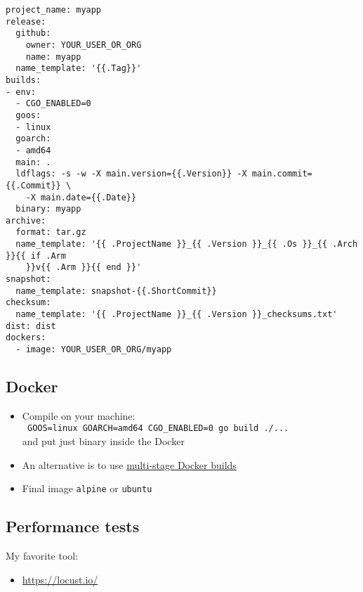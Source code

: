 \documentclass[11pt, letterpaper]{article}
\begin{document}
\begin{verbatim}
project_name: myapp
release:
  github:
    owner: YOUR_USER_OR_ORG
    name: myapp
  name_template: '{{.Tag}}'
builds:
- env:
  - CGO_ENABLED=0
  goos:
  - linux
  goarch:
  - amd64
  main: .
  ldflags: -s -w -X main.version={{.Version}} -X main.commit={{.Commit}} \
    -X main.date={{.Date}}
  binary: myapp
archive:
  format: tar.gz
  name_template: '{{ .ProjectName }}_{{ .Version }}_{{ .Os }}_{{ .Arch }}{{ if .Arm
    }}v{{ .Arm }}{{ end }}'
snapshot:
  name_template: snapshot-{{.ShortCommit}}
checksum:
  name_template: '{{ .ProjectName }}_{{ .Version }}_checksums.txt'
dist: dist
dockers:
  - image: YOUR_USER_OR_ORG/myapp
\end{verbatim}

\subsection{Docker}

\begin{itemize}
\item Compile on your machine:\\ \verb| GOOS=linux GOARCH=amd64 CGO_ENABLED=0 go build ./...| \\ and put just binary inside the Docker
\item An alternative is to use \href{https://docs.docker.com/develop/develop-images/multistage-build/}{multi-stage Docker builds}
\item Final image \verb|alpine| or \verb|ubuntu|
\end{itemize}

\subsection{Performance tests}

My favorite tool:

\begin{itemize}
  \item \href{https://locust.io/}{https://locust.io/}
\end{itemize}
\end{document}
